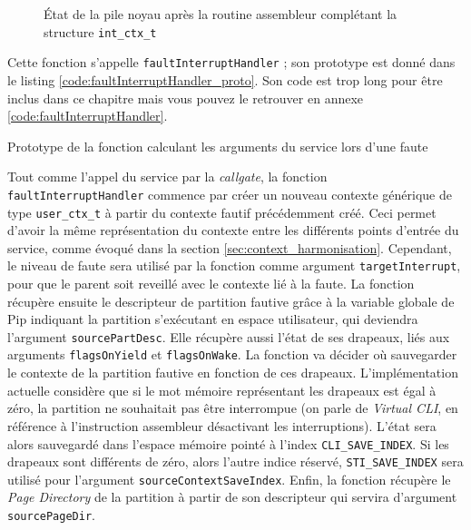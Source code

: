 		\begin{figure}[!ht]
			
			\caption{État de la pile noyau après la routine assembleur complétant la structure \texttt{int\_ctx\_t}}
			\label{fig:interrupt_stack}
		\end{figure}

		Cette fonction s'appelle \texttt{faultInterruptHandler} ; son prototype est donné dans le listing \ref{code:faultInterruptHandler_proto}. Son code est trop long pour être inclus dans ce chapitre mais vous pouvez le retrouver en annexe \ref{code:faultInterruptHandler}.

		\begin{listing}[!ht]
			\caption{Prototype de la fonction calculant les arguments du service lors d'une faute}
			\label{code:faultInterruptHandler_proto}
		\end{listing}

		Tout comme l'appel du service par la \emph{callgate}, la fonction \texttt{faultInterruptHandler} commence par créer un nouveau contexte générique de type \texttt{user\_ctx\_t} à partir du contexte fautif précédemment créé. Ceci permet d'avoir la même représentation du contexte entre les différents points d'entrée du service, comme évoqué dans la section \ref{sec:context_harmonisation}. Cependant, le niveau de faute sera utilisé par la fonction comme argument \texttt{targetInterrupt}, pour que le parent soit reveillé avec le contexte lié à la faute.
		La fonction récupère ensuite le descripteur de partition fautive grâce à la variable globale de Pip indiquant la partition s'exécutant en espace utilisateur, qui deviendra l'argument \texttt{sourcePartDesc}. Elle récupère aussi l'état de ses drapeaux, liés aux arguments \texttt{flagsOnYield} et \texttt{flagsOnWake}. La fonction va décider où sauvegarder le contexte de la partition fautive en fonction de ces drapeaux. L'implémentation actuelle considère que si le mot mémoire représentant les drapeaux est égal à zéro, la partition ne souhaitait pas être interrompue (on parle de \emph{Virtual CLI}, en référence à l'instruction assembleur désactivant les interruptions). L'état sera alors sauvegardé dans l'espace mémoire pointé à l'index \texttt{CLI\_SAVE\_INDEX}. Si les drapeaux sont différents de zéro, alors l'autre indice réservé, \texttt{STI\_SAVE\_INDEX} sera utilisé pour l'argument \texttt{sourceContextSaveIndex}.
		Enfin, la fonction récupère le \emph{Page Directory} de la partition à partir de son descripteur qui servira d'argument \texttt{sourcePageDir}.

